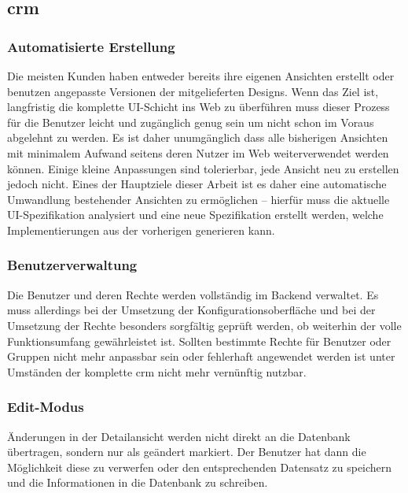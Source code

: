 \subsection{\acrlong{crm}}
\subsubsection{Automatisierte Erstellung}
Die meisten Kunden haben entweder bereits ihre eigenen Ansichten erstellt oder benutzen angepasste Versionen der mitgelieferten Designs. Wenn das Ziel ist, langfristig die komplette UI-Schicht ins Web zu überführen muss dieser Prozess für die Benutzer leicht und zugänglich genug sein um nicht schon im Voraus abgelehnt zu werden. Es ist daher unumgänglich dass alle bisherigen Ansichten mit minimalem Aufwand seitens deren Nutzer im Web weiterverwendet werden können. Einige kleine Anpassungen sind tolerierbar, jede Ansicht neu zu erstellen jedoch nicht. Eines der Hauptziele dieser Arbeit ist es daher eine automatische Umwandlung bestehender Ansichten zu ermöglichen -- hierfür muss die aktuelle UI-Spezifikation analysiert und eine neue Spezifikation erstellt werden, welche Implementierungen aus der vorherigen generieren kann.

\subsubsection{Benutzerverwaltung}
Die Benutzer und deren Rechte werden vollständig im Backend verwaltet. Es muss allerdings bei der Umsetzung der Konfigurationsoberfläche und bei der Umsetzung der Rechte besonders sorgfältig geprüft werden, ob weiterhin der volle Funktionsumfang gewährleistet ist. Sollten bestimmte Rechte für Benutzer oder Gruppen nicht mehr anpassbar sein  oder fehlerhaft angewendet werden ist unter Umständen der komplette \gls{crm} nicht mehr vernünftig nutzbar.

\subsubsection{Edit-Modus}
Änderungen in der Detailansicht werden nicht direkt an die Datenbank übertragen, sondern nur als geändert markiert. Der Benutzer hat dann die Möglichkeit diese zu verwerfen oder den entsprechenden Datensatz zu speichern und die Informationen in die Datenbank zu schreiben.

